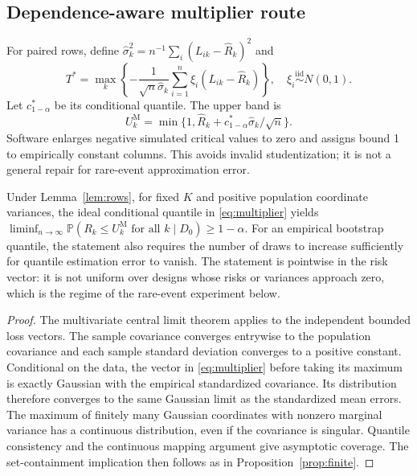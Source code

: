 \documentclass[twoside,11pt]{article}
\newcommand{\Pp}{\mathbb P}
\begin{document}
\subsection{Dependence-aware multiplier route}
For paired rows, define $\widehat\sigma_k^2=n^{-1}\sum_i(L_{ik}-\widehat R_k)^2$ and
\begin{equation}
T^*=\max_k\left\{-\frac{1}{\sqrt n\widehat\sigma_k}
                   \sum_{i=1}^n\xi_i(L_{ik}-\widehat R_k)\right\},
\quad \xi_i\stackrel{\mathrm{iid}}\sim N(0,1).
\label{eq:multiplier}
\end{equation}
Let $c^*_{1-\alpha}$ be its conditional quantile. The upper band is
\begin{equation}
U_k^{\mathrm M}=\min\{1,\widehat R_k+
             c^*_{1-\alpha}\widehat\sigma_k/\sqrt n\}.
\label{eq:multupper}
\end{equation}
Software enlarges negative simulated critical values to zero and assigns bound 1 to
empirically constant columns. This avoids invalid studentization; it is not a general repair
for rare-event approximation error.

\begin{proposition}
\label{prop:mult}
Under Lemma~\ref{lem:rows}, for fixed $K$ and positive population coordinate variances,
the ideal conditional quantile in \eqref{eq:multiplier} yields
$\liminf_{n\to\infty}\Pp(R_k\leq U_k^{\mathrm M}\text{ for all }k\mid D_0)\geq1-\alpha$.
For an empirical bootstrap quantile, the statement also requires the number of draws to
increase sufficiently for quantile estimation error to vanish.
The statement is pointwise in the risk vector: it is not uniform over designs whose risks
or variances approach zero, which is the regime of the rare-event experiment below.
\end{proposition}
\begin{proof}
The multivariate central limit theorem applies to the independent bounded loss vectors.
The sample covariance converges entrywise to the population covariance and each sample
standard deviation converges to a positive constant. Conditional on the data, the vector
in \eqref{eq:multiplier} before taking its maximum is exactly Gaussian with the empirical
standardized covariance. Its distribution therefore converges to the same Gaussian limit
as the standardized mean errors. The maximum of finitely many Gaussian coordinates with
nonzero marginal variance has a continuous distribution, even if the covariance is singular.
Quantile consistency and the continuous mapping argument give asymptotic coverage.
The set-containment implication then follows as in Proposition~\ref{prop:finite}.
\end{proof}
\end{document}
